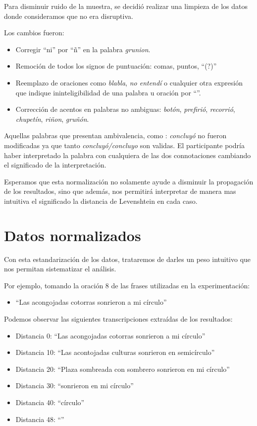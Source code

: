 Para disminuir ruido de la muestra, se decidió realizar una limpieza de los datos donde consideramos que no era disruptiva.

Los cambios fueron:

\begin{itemize}
	\item Corregir ``ni'' por ``ñ'' en la palabra \textit{grunion}.
	\item Remoción de todos los signos de puntuación: comas, puntos, ``(?)''
	\item Reemplazo de oraciones como \textit{blabla}, \textit{no entendí} o cualquier otra expresión que indique ininteligibilidad de una palabra u oración por ``''.
	\item Corrección de acentos en palabras no ambiguas: \textit{botón}, \textit{prefirió}, \textit{recorrió}, \textit{chupetín}, \textit{riñon}, \textit{gruñón}.
\end{itemize}

Aquellas palabras que presentan ambivalencia, como : \textit{concluyó} no fueron modificadas ya que tanto \textit{concluyó/concluyo} son validas. El participante podría haber interpretado la palabra con cualquiera de las dos connotaciones cambiando el significado de la interpretación.

Esperamos que esta normalización no solamente ayude a disminuir la propagación de los resultados, sino que además, nos permitirá interpretar de manera mas intuitiva el significado la distancia de Levenshtein en cada caso.

\clearpage

\section{Datos normalizados}

Con esta estandarización de los datos, trataremos de darles un peso intuitivo que nos permitan sistematizar el análisis.

Por ejemplo, tomando la oración $8$ de las frases utilizadas en la experimentación: 

\begin{itemize}
	\item ``Las acongojadas cotorras sonrieron a mi círculo''
\end{itemize}

Podemos observar las siguientes transcripciones extraídas de los resultados:

\begin{itemize}
	\item Distancia 0: ``Las acongojadas cotorras sonrieron a mi círculo''
	\item Distancia 10: ``Las acontojadas culturas sonrieron en semicírculo''
	\item Distancia 20: ``Plaza sombreada con sombrero sonrieron en mi círculo''
	\item Distancia 30: ``sonrieron en mi círculo''
	\item Distancia 40: ``círculo''
	\item Distancia 48: ``''
\end{itemize}

